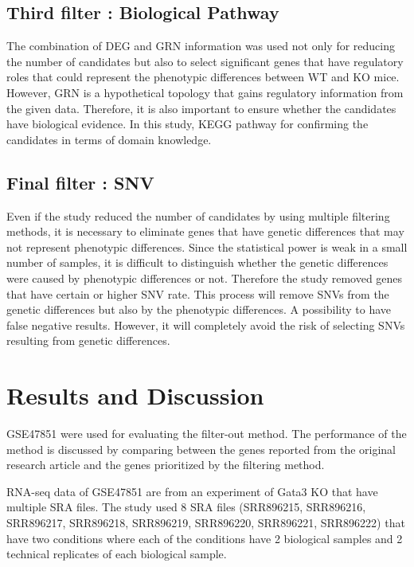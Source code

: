 \documentclass[oneside,phd]{snuthesis}
\begin{document}
\subsection{Third filter : Biological Pathway}

The combination of DEG and GRN information was used not only for reducing the number of candidates but also to select significant genes that have regulatory roles that could represent the phenotypic differences between WT and KO mice. 
However, GRN is a hypothetical topology that gains regulatory information from the given data. Therefore, it is also important to ensure whether the candidates have biological evidence.
In this study, KEGG pathway \citep{kanehisa2000kegg} for confirming the candidates in terms of domain knowledge.


\subsection{Final filter : SNV}

Even if the study reduced the number of candidates by using multiple filtering methods, it is necessary to eliminate genes that have genetic differences that may not represent phenotypic differences. 
Since the statistical power is weak in a small number of samples, it is difficult to distinguish whether the genetic differences were caused by phenotypic differences or not. 
Therefore the study removed genes that have certain or higher SNV rate. 
This process will remove SNVs from the genetic differences but also by the phenotypic differences. A possibility to have false negative results.
However, it will completely avoid the risk of selecting SNVs resulting from genetic differences. 



\section{Results and Discussion}

GSE47851 were used for evaluating the filter-out method. 
The performance of the method is discussed by comparing between the genes reported from the original research article \citep{yagi2014transcription} and the genes prioritized by the filtering method. 

RNA-seq data of GSE47851 are from an experiment of Gata3 KO that have multiple SRA files. The study used 8 SRA files (SRR896215, SRR896216, SRR896217, SRR896218, SRR896219, SRR896220, SRR896221, SRR896222) that have two conditions where each of the conditions have 2 biological samples and 2 technical replicates of each biological sample.
\end{document}
